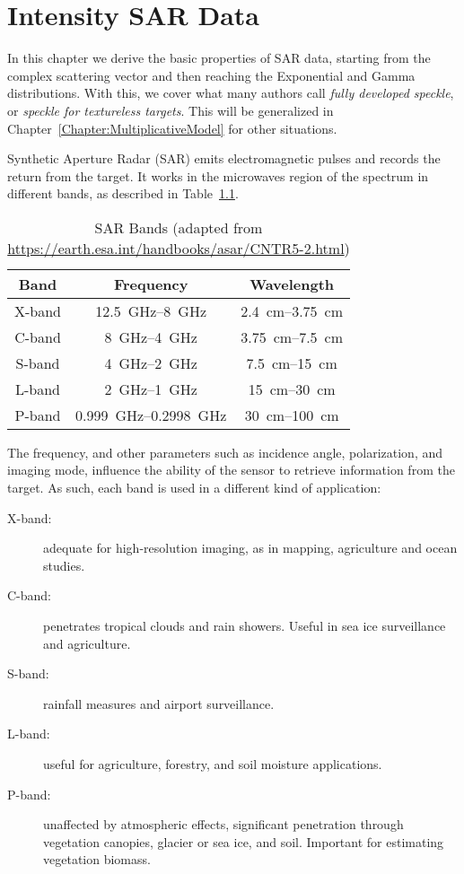 \chapter{Intensity SAR Data}\label{Chapter:DataFormation}

In this chapter we derive the basic properties of SAR data, starting from the complex scattering vector and then reaching the Exponential and Gamma distributions.
With this, we cover what many authors call \textit{fully developed speckle}, or \textit{speckle for textureless targets}.
This will be generalized in Chapter~\ref{Chapter:MultiplicativeModel} for other situations.

Synthetic Aperture Radar (SAR) emits electromagnetic pulses and records the return from the target.
It works in the microwaves region of the spectrum in different bands, as described in Table~\ref{Tab:Bands}.

\begin{table}[hbt]
\caption{SAR Bands (adapted from \url{https://earth.esa.int/handbooks/asar/CNTR5-2.html})}\label{Tab:Bands}
\centering
\begin{tabular}{ccc}
\toprule
\textbf{Band}	& \textbf{Frequency}			& \textbf{Wavelength} \\ \midrule
X-band			& \SIrange[range-units = single]{12.5}{8}{\GHz}	& \SIrange[range-units = single]{2.4}{3.75}{\cm} \\
C-band			& \SIrange[range-units = single]{8}{4}{\GHz} 			& \SIrange[range-units = single]{3.75}{7.5}{\cm}\\
S-band			& \SIrange[range-units = single]{4}{2}{\GHz}	& \SIrange[range-units = single]{7.5}{15}{\cm} \\
L-band			& \SIrange[range-units = single]{2}{1}{\GHz}	& \SIrange[range-units = single]{15}{30}{\cm} \\
P-band			& \SIrange[range-units = single]{0.999}{0.2998}{\GHz}	& \SIrange[range-units = single]{30}{100}{\cm} \\
\bottomrule
\end{tabular}
\end{table}

The frequency, and other parameters such as incidence angle, polarization, and imaging mode, influence the ability of the sensor to retrieve information from the target.
As such, each band is used in a different kind of application:
\begin{description}
\item[X-band:] adequate for high-resolution imaging, as in mapping, agriculture and ocean studies.
\item[C-band:] penetrates tropical clouds and rain showers. Useful in sea ice surveillance and agriculture.
\item[S-band:] rainfall measures and airport surveillance.
\item[L-band:] useful for agriculture, forestry, and soil moisture applications.
\item[P-band:] unaffected by atmospheric effects, significant penetration through vegetation canopies, glacier or sea ice, and soil. Important for estimating vegetation biomass.
\end{description}


